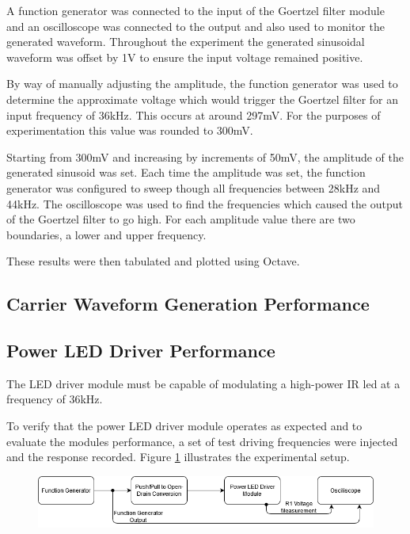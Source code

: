 A function generator was connected to the input of the Goertzel filter module and an oscilloscope was connected to the output and also used to monitor the generated waveform. Throughout the experiment the generated sinusoidal waveform was offset by 1V to ensure the input voltage remained positive.

By way of manually adjusting the amplitude, the function generator was used to determine the approximate voltage which would trigger the Goertzel filter for an input frequency of 36kHz. This occurs at around 297mV. For the purposes of experimentation this value was rounded to 300mV.

Starting from 300mV and increasing by increments of 50mV, the amplitude of the generated sinusoid was set. Each time the amplitude was set, the function generator was configured to sweep though all frequencies between 28kHz and 44kHz. The oscilloscope was used to find the frequencies which caused the output of the Goertzel filter to go high. For each amplitude value there are two boundaries, a lower and upper frequency.

These results were then tabulated and plotted using Octave.


\subsection{Carrier Waveform Generation Performance}


\subsection{Power LED Driver Performance}

The LED driver module must be capable of modulating a high-power IR led at a frequency of 36kHz.

To verify that the power LED driver module operates as expected and to evaluate the modules performance, a set of test driving frequencies were injected and the response recorded. Figure \ref{fig:power_led_driver_experiemnet_setup} illustrates the experimental setup.

\begin{figure}[H]
	\centering
	\includegraphics[width=.9\linewidth]{figures/experimentation/power_led_driver_experimental_setup.png}
	\label{fig:power_led_driver_experiemnet_setup}
\end{figure}

